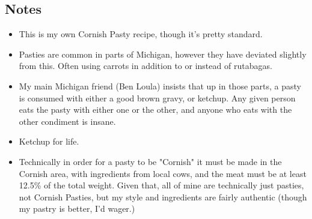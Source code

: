 \begin{multicols}{2}
\subsection*{Notes}
\begin{itemize}
    \item This is my own Cornish Pasty recipe, though it's pretty standard.
    \item Pasties are common in parts of Michigan, however they have deviated slightly from this. Often using carrots in addition to or instead of rutabagas.
    \item My main Michigan friend (Ben Loula) insists that up in those parts, a pasty is consumed with either a good brown gravy, or ketchup. Any given person eats the pasty with either one or the other, and anyone who eats with the other condiment is insane.
    \item Ketchup for life.
    \item Technically in order for a pasty to be "Cornish" it must be made in the Cornish area, with ingredients from local cows, and the meat must be at least 12.5\% of the total weight. Given that, all of mine are technically just pasties, not Cornish Pasties, but my style and ingredients are fairly authentic (though my pastry is better, I'd wager.)
\end{itemize}
\end{multicols}
\clearpage